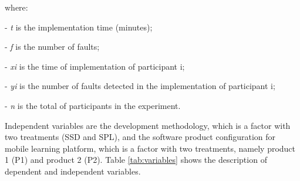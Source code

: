 where:

- \textit{t} is the implementation time (minutes);

- \textit{f} is the number of faults;

- \textit{xi} is the time of implementation of participant i;

- \textit{yi} is the number of faults detected in the implementation of participant i;

- \textit{n} is the total of participants in the experiment.

\normalsize


\vspace{5mm}


Independent variables are the development methodology, which is a factor with two treatments (SSD and SPL), and the software product configuration for mobile learning platform, which is a factor with two treatments, namely product 1 (P1) and product 2 (P2). Table \ref{tab:variables} shows the description of dependent and independent variables.

